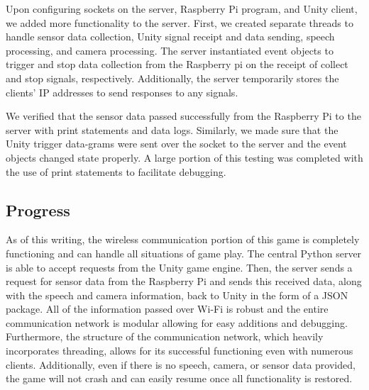 \documentclass[titlepage, 12pt]{scrartcl}
\begin{document}
        Upon configuring sockets on the server, Raspberry Pi program, and Unity client, we added more functionality to the server. First, we created separate threads to handle sensor data collection, Unity signal receipt and data sending, speech processing, and camera processing. The server instantiated event objects to trigger and stop data collection from the Raspberry pi on the receipt of collect and stop signals, respectively. Additionally, the server temporarily stores the clients' IP addresses to send responses to any signals. \par
        We verified that the sensor data passed successfully from the Raspberry Pi to the server with print statements and data logs. Similarly, we made sure that the Unity trigger data-grams were sent over the socket to the server and the event objects changed state properly. A large portion of this testing was completed with the use of print statements to facilitate debugging. \par
    \subsection{Progress}
        As of this writing, the wireless communication portion of this game is completely functioning and can handle all situations of game play. The central Python server is able to accept requests from the Unity game engine. Then, the server sends a request for sensor data from the Raspberry Pi and sends this received data, along with the speech and camera information, back to Unity in the form of a JSON package. All of the information passed over Wi-Fi is robust and the entire communication network is modular allowing for easy additions and debugging. Furthermore, the structure of the communication network, which heavily incorporates threading, allows for its successful functioning even with numerous clients. Additionally, even if there is no speech, camera, or sensor data provided, the game will not crash and can easily resume once all functionality is restored. \par
\end{document}
